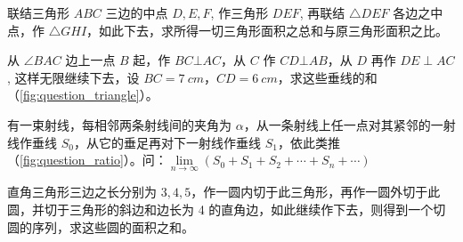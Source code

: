 \begin{Exercise}
\begin{question}
  \item 联结三角形 $ABC$ 三边的中点 $D,E,F$, 作三角形 $DEF$, 再联结 $\triangle DEF$ 各边之中点，作 $\triangle GHI$，如此下去，求所得一切三角形面积之总和与原三角形面积之比。
  \item 从 $\angle BAC$ 边上一点 $B$ 起，作 $BC\bot AC$，从 $C$ 作 $CD\bot AB$，从 $D$ 再作 $DE \perp AC$, 这样无限继续下去，设 $BC=\qty{7}{cm}$，$CD=\qty{6}{cm}$，求这些垂线的和（\cref{fig:question_triangle}）。
  \item 有一束射线，每相邻两条射线间的夹角为 $\alpha$，从一条射线上任一点对其紧邻的一射线作垂线 $S_0$，从它的垂足再对下一射线作垂线 $S_1$，依此类推（\cref{fig:question_ratio}）。问：$\lim\limits_{n\to\infty} (S_0+S_1+S_2+\cdots +S_n+\cdots )$
  \begin{figurehere}
    \begin{minipage}[t]{0.48\textwidth}
      \centering
      \caption{}\label{fig:question_triangle}
    \end{minipage}
    \begin{minipage}[t]{0.48\textwidth}
      \centering
      \caption{}\label{fig:question_ratio}
    \end{minipage}
  \end{figurehere}
  \item 直角三角形三边之长分别为 $3,4,5$，作一圆内切于此三角形，再作一圆外切于此圆，并切于三角形的斜边和边长为 4 的直角边，如此继续作下去，则得到一个切圆的序列，求这些圆的面积之和。
\end{question}
\end{Exercise}

